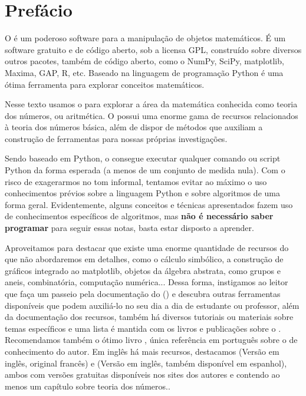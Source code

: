 \chapter*{Prefácio}


O \sage é um poderoso software para a manipulação de objetos matemáticos.
É um software gratuito e de código aberto, sob a licensa GPL, construído
sobre diversos outros pacotes, também de código aberto, como o NumPy, 
SciPy, matplotlib, Maxima, GAP, R, etc.  Baseado na linguagem de programação
Python é uma ótima ferramenta para explorar conceitos matemáticos. 

Nesse texto usamos o \sage para explorar a área da matemática
conhecida como teoria dos números, ou aritmética. O \sage possui
uma enorme gama de recursos relacionados à teoria dos números
básica, além de dispor de métodos que auxiliam a construção de
ferramentas para nossas próprias investigações.

Sendo baseado em Python, o \sage consegue executar qualquer
comando ou script Python da forma esperada (a menos
de um conjunto de medida nula). 
Com o risco de exagerarmos no tom informal, tentamos evitar ao máximo
o uso conhecimentos prévios sobre a linguagem Python e sobre
algoritmos de uma forma geral. Evidentemente, alguns
conceitos e técnicas apresentados fazem uso de conhecimentos 
específicos de algoritmos, mas \textbf{não é necessário
saber programar} para seguir essas notas, basta estar disposto
a aprender.

Aproveitamos para destacar que existe uma 
enorme quantidade de recursos do \sage que não
abordaremos em detalhes, como o cálculo simbólico, a construção de gráficos 
integrado ao matplotlib, objetos da álgebra abstrata,
como grupos e aneis, combinatória, computação numérica...
Dessa forma, instigamos ao leitor que faça um passeio
pela documentação do \sage (\cite{sagedoc}) e descubra outras ferramentas
disponíveis que podem auxiliá-lo no seu dia a dia de estudante
ou professor, além da documentação dos recursos, também há diversos
tutoriais ou materiais sobre temas específicos e uma lista é mantida
com os livros e publicações sobre o \sage.
Recomendamos também o ótimo livro \cite{sagesbm},
única referência em português sobre o \sage de conhecimento
do autor. Em inglês há mais recursos, destacamos
\cite{zimmermann2018computational} (Versão em inglês, original
francês) e \cite{bard2015sage} (Versão em inglês, também
disponível em espanhol), ambos com versões gratuitas 
disponíveis nos sites dos autores e contendo ao menos
um capítulo sobre teoria dos números..



